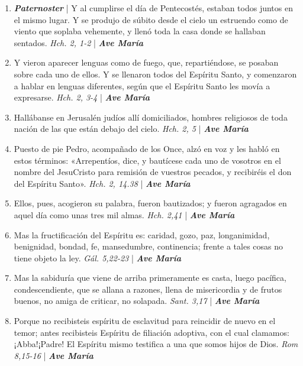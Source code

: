 \documentclass[../../devocionario.tex]{subfiles}
\begin{document}
    \begin{enumerate}
    
        \item \textbf{\textit{Paternoster}} | Y al cumplirse el día de Pentecostés, estaban todos juntos en el mismo lugar. 
            Y se produjo de súbito desde el cielo un estruendo como de viento que soplaba vehemente, 
            y llenó toda la casa donde se hallaban sentados. \textit{Hch. 2, 1-2} | \textbf{\textit{Ave María}}

        \item Y vieron aparecer lenguas como de fuego, que, repartiéndose, se posaban sobre cada uno de ellos. 
            Y se llenaron todos del Espíritu Santo, y comenzaron a hablar en lenguas diferentes, 
            según que el Espíritu Santo les movía a expresarse. \textit{Hch. 2, 3-4} | \textbf{\textit{Ave María}}

        \item Hallábanse en Jerusalén judíos allí domiciliados, hombres religiosos de toda nación de 
            las que están debajo del cielo. \textit{Hch. 2, 5} | \textbf{\textit{Ave María}}

        \item Puesto de pie Pedro, acompañado de los Once, alzó en voz y les habló en estos términos: 
            «Arrepentíos, dice, y bautícese cada uno de vosotros en el nombre del JesuCristo para remisión de vuestros pecados, 
            y recibiréis el don del Espíritu Santo». \textit{Hch. 2, 14.38} | \textbf{\textit{Ave María}}

        \item Ellos, pues, acogieron su palabra, fueron bautizados; y fueron agragados 
            en aquel día como unas tres mil almas. \textit{Hch. 2,41} | \textbf{\textit{Ave María}}

        \item Mas la fructificación del Espíritu es: caridad, gozo, paz, longanimidad, benignidad, 
            bondad, fe, mansedumbre, continencia; frente a tales cosas no tiene objeto la ley. \textit{Gál. 5,22-23} | \textbf{\textit{Ave María}}

        \item Mas la sabiduría que viene de arriba primeramente es casta, luego pacífica, condescendiente, 
            que se allana a razones, llena de misericordia y de frutos buenos, 
            no amiga de criticar, no solapada. \textit{Sant. 3,17} | \textbf{\textit{Ave María}}

        \item Porque no recibisteis espíritu de esclavitud para reincidir de nuevo en el temor; 
            antes recibisteis Espíritu de filiación adoptiva, con el cual clamamos: ¡Abba!¡Padre! 
            El Espíritu mismo testifica a una que somos hijos de Dios. \textit{Rom 8,15-16} | \textbf{\textit{Ave María}}


\end{enumerate}
\end{document}
